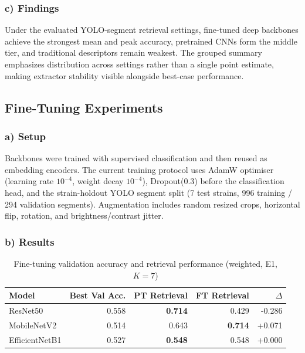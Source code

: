 \subsubsection{c) Findings}

Under the evaluated YOLO-segment retrieval settings, fine-tuned deep backbones achieve the strongest mean and peak accuracy, pretrained CNNs form the middle tier, and traditional descriptors remain weakest. The grouped summary emphasizes distribution across settings rather than a single point estimate, making extractor stability visible alongside best-case performance.

\subsection{Fine-Tuning Experiments}\label{fine-tuning-experiments}

\subsubsection{a) Setup}

Backbones were trained with supervised classification and then reused as embedding encoders. The current training protocol uses AdamW optimiser (learning rate $10^{-4}$, weight decay $10^{-4}$), Dropout(0.3) before the classification head, and the strain-holdout YOLO segment split (7 test strains, 996 training / 294 validation segments). Augmentation includes random resized crops, horizontal flip, rotation, and brightness/contrast jitter.

\subsubsection{b) Results}

\begin{table}[ht]
\centering
\caption{Fine-tuning validation accuracy and retrieval performance (weighted, E1, $K=7$)}
\begin{tabularx}{\textwidth}{@{}lrrrr@{}}
\toprule
\textbf{Model} & \textbf{Best Val Acc.} & \textbf{PT Retrieval} & \textbf{FT Retrieval} & \textbf{$\Delta$} \\
\midrule
ResNet50       & 0.558 & \textbf{0.714} & 0.429 & -0.286 \\
MobileNetV2    & 0.514 & 0.643 & \textbf{0.714} & +0.071 \\
EfficientNetB1 & 0.527 & \textbf{0.548} & 0.548 & +0.000 \\
\bottomrule
\end{tabularx}
\label{tab:finetune-results}
\end{table}

